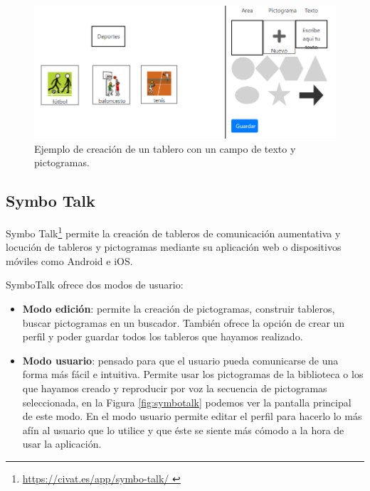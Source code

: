 \begin{itemize}
	\begin{figure}[h!]
		\centering
		\includegraphics[width=0.7\linewidth]{Imagenes/Bitmap/tableroPicTableros}
		\caption{Ejemplo de creación de un tablero con un campo de texto y pictogramas.}
		\label{fig:tableropictableros}
	\end{figure}
	
	
\end{itemize}


	
\subsection{Symbo Talk}

Symbo Talk\footnote{\url{  https://civat.es/app/symbo-talk/ }} permite la creación de tableros de comunicación aumentativa y locución de tableros y pictogramas mediante su aplicación web o dispositivos móviles como Android e iOS.

SymboTalk ofrece dos modos de usuario:

\begin{itemize}
	\item \textbf{Modo edición}: permite la creación de pictogramas, construir tableros, buscar pictogramas en un buscador. También ofrece la opción de crear un perfil y poder guardar todos los tableros que hayamos realizado.
	
	
	\item \textbf{Modo usuario}: pensado para que el usuario pueda comunicarse de una forma más fácil e intuitiva. Permite usar los pictogramas de la biblioteca o los que hayamos creado y reproducir por voz la secuencia de pictogramas seleccionada, en la Figura \ref{fig:symbotalk} podemos ver la pantalla principal de este modo. En el modo usuario permite editar el perfil para hacerlo lo más afín al usuario que lo utilice y que éste se siente más cómodo a la hora de usar la aplicación.
	
	
\end{itemize}

